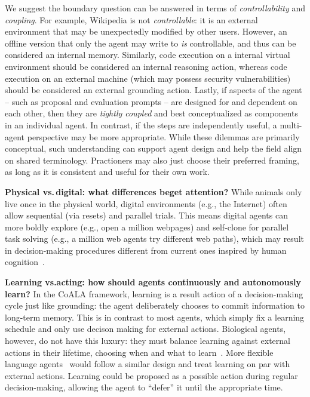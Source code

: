 \documentclass[10pt]{article} %
\begin{document}
We suggest the boundary question can be answered in terms of \emph{controllability} and \emph{coupling}.
For example, Wikipedia is not \emph{controllable}: it is an external environment that may be unexpectedly modified by other users. However, an offline version that only the agent may write to \emph{is} controllable, and thus can be considered an internal memory. Similarly, code execution on a internal virtual environment should be considered an internal reasoning action, whereas code execution on an external machine (which may possess security vulnerabilities) should be considered an external grounding action. Lastly, if aspects of the agent -- such as proposal and evaluation prompts -- are designed for and dependent on each other, then they are \emph{tightly coupled} and best conceptualized as components in an individual agent. In contrast, if the steps are independently useful, a multi-agent perspective may be more appropriate.                                                   
While these dilemmas are primarily conceptual, such understanding can support agent design and help the field align on shared terminology. Practioners may also just choose their preferred framing, as long as it is consistent and useful for their own work.

\textbf{Physical vs.\,digital: what differences beget attention?} While animals only live once in the physical world, digital environments (e.g., the Internet) often allow sequential (via resets) and parallel trials. This means digital agents can more boldly explore (e.g., open a million webpages) and self-clone for parallel task solving (e.g., a million web agents try different web paths), which may result in decision-making procedures different from current ones inspired by human cognition~\citep{griffiths2020understanding}. 

\textbf{Learning vs.\;acting: how should agents continuously and autonomously learn?} In the CoALA framework, learning is a result action of a decision-making cycle just like grounding: the agent deliberately chooses to commit information to long-term memory. This is in contrast to most agents, which simply fix a learning schedule and only use decison making for external actions. Biological agents, however, do not have this luxury: they must balance learning against external actions in their lifetime, choosing when and what to learn~\citep{mattar2018prioritized}. More flexible language agents~\citep{wang2023voyager, park2023generative} would follow a similar design and treat learning on par with external actions. Learning could be proposed as a possible action during regular decision-making, allowing the agent to ``defer'' it until the appropriate time. 
\end{document}
